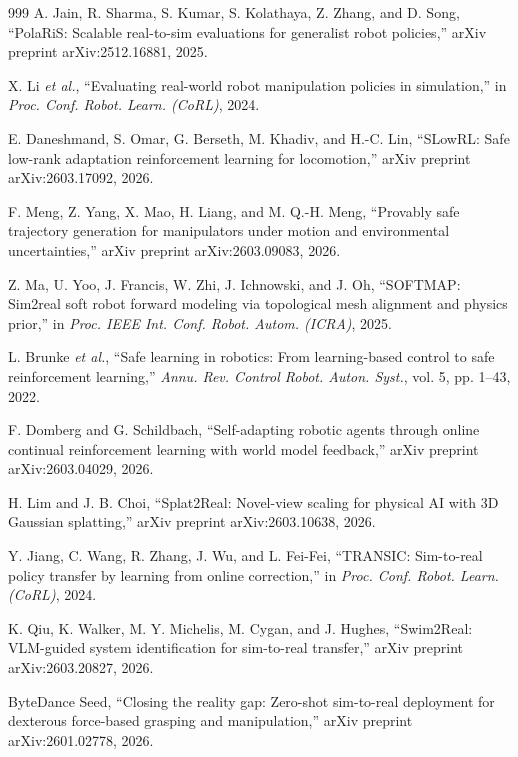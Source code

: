 ﻿\documentclass[11pt,a4paper]{article}
\begin{document}
\begin{thebibliography}{999}
A. Jain, R. Sharma, S. Kumar, S. Kolathaya, Z. Zhang, and D. Song, ``{PolaRiS}: Scalable real-to-sim evaluations for generalist robot policies,'' arXiv preprint arXiv:2512.16881, 2025.

X. Li \textit{et al.}, ``Evaluating real-world robot manipulation policies in simulation,'' in \textit{Proc. Conf. Robot. Learn. (CoRL)}, 2024.

E. Daneshmand, S. Omar, G. Berseth, M. Khadiv, and H.-C. Lin, ``{SLowRL}: Safe low-rank adaptation reinforcement learning for locomotion,'' arXiv preprint arXiv:2603.17092, 2026.

F. Meng, Z. Yang, X. Mao, H. Liang, and M. Q.-H. Meng, ``Provably safe trajectory generation for manipulators under motion and environmental uncertainties,'' arXiv preprint arXiv:2603.09083, 2026.

Z. Ma, U. Yoo, J. Francis, W. Zhi, J. Ichnowski, and J. Oh, ``{SOFTMAP}: Sim2real soft robot forward modeling via topological mesh alignment and physics prior,'' in \textit{Proc. IEEE Int. Conf. Robot. Autom. (ICRA)}, 2025.

L. Brunke \textit{et al.}, ``Safe learning in robotics: From learning-based control to safe reinforcement learning,'' \textit{Annu. Rev. Control Robot. Auton. Syst.}, vol. 5, pp. 1--43, 2022.

F. Domberg and G. Schildbach, ``Self-adapting robotic agents through online continual reinforcement learning with world model feedback,'' arXiv preprint arXiv:2603.04029, 2026.

H. Lim and J. B. Choi, ``Splat2Real: Novel-view scaling for physical {AI} with {3D} Gaussian splatting,'' arXiv preprint arXiv:2603.10638, 2026.

Y. Jiang, C. Wang, R. Zhang, J. Wu, and L. Fei-Fei, ``{TRANSIC}: Sim-to-real policy transfer by learning from online correction,'' in \textit{Proc. Conf. Robot. Learn. (CoRL)}, 2024.

K. Qiu, K. Walker, M. Y. Michelis, M. Cygan, and J. Hughes, ``Swim2Real: VLM-guided system identification for sim-to-real transfer,'' arXiv preprint arXiv:2603.20827, 2026.

ByteDance Seed, ``Closing the reality gap: Zero-shot sim-to-real deployment for dexterous force-based grasping and manipulation,'' arXiv preprint arXiv:2601.02778, 2026.


\end{thebibliography}
\end{document}
